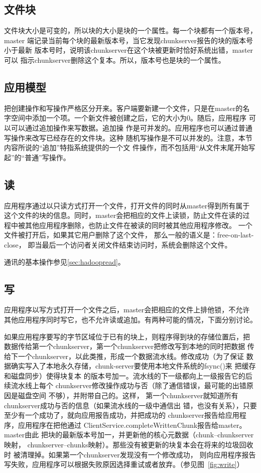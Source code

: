 \documentclass[11pt,a4paper]{scrartcl}
\begin{document}
\begin{CJK*}{UTF8}{gbsn}
\subsection{文件块}
文件块大小是可变的，所以块的大小是块的一个属性。每一个块都有一个版本号，master
端记录当前每个块的最新版本号，当它发现chunkserver报告的块的版本号小于最新
版本号时，说明该chunkserver在这个块被更新时恰好系统出错，master可以
指示chunkserver删除这个复本。所以，版本号也是块的一个属性。
\subsection{应用模型}
把创建操作和写操作严格区分开来。客户端要新建一个文件，只是在master的名
字空间中添加一个项。一个新文件被创建之后，它的大小为0。随后，应用程序
可以可以通过追加操作来写数据。追加操
作是可并发的。应用程序也可以通过普通写操作来改写已经存在的文件块。这种
随机写操作是不可以并发的。注意，本节内容所说的“追加”特指系统提供的一个文
件操作，而不包括用“从文件末尾开始写起”的“普通”写操作。
\subsection{读}
应用程序通过以只读方式打开一个文件，打开文件的同时从master得到所有属于
这个文件的块的信息。同时，master会把相应的文件上读锁，防止文件在读的过
程中被其他应用程序删除，也防止文件在被读的同时被其他应用程序修改。
{\color{red}一个文件被打开后，如果其它用户删除了这个文件，
那么一般的语义是：free-on-last-close，
即当最后一个访问者关闭文件结束访问时，系统会删除这个文件。}

通讯的基本操作参见\ref{sec:hadoopread}。
\subsection{写}\label{subsec:tfswrite}
应用程序以写方式打开一个文件之后，master会把相应的文件上排他锁，不允许
其他应用程序同时写它，也不允许读或追加。有两种可能的情况，下面分别讨论。

如果应用程序要写的字节区域位于已有的块上，则程序得到块的存储位置后，把
数据传给第一个chunkserver，第一个chunkserver把修改写到本地的同时把数据
传给下一个chunkserver，以此类推，形成一个数据流水线。修改成功（{\color{red}为了保证
数据确实写入了本地永久存储，chunk-server要使用本地文件系统的fsync()来
把缓存和磁盘同步}）使得块复本
的版本号加一。流水线的下一级都向上一级报告它的后续流水线上每个
chunkserver修改操作成功与否（除了通信错误，最可能的出错原因是磁盘空间
不够），并附带自己的。这样，
第一个chunkserver就知道所有chunkserver成功与否的信息（如果流水线的一级中通信出
错，也没有关系），只要至少有一个成功了，就向应用报告成功，并把成功的
chunkserver报告给应用程序，应用程序在把他通过
ClientService.completeWrittenChunk报告给master。master由此
把块的最新版本号加一，并更新他的核心元数据（chunk--chunkserver映射，
chunkserver--chunks映射）。那些没有被更新的块复本会在将来的垃圾回收时
被清理掉。如果第一个chunkserver发现没有一个修改成功，
则向应用程序报告写失败，应用程序可以根据失败原因选择重试或者放弃。（参见图~\ref{fig:write}）


\end{CJK*}
\end{document}
